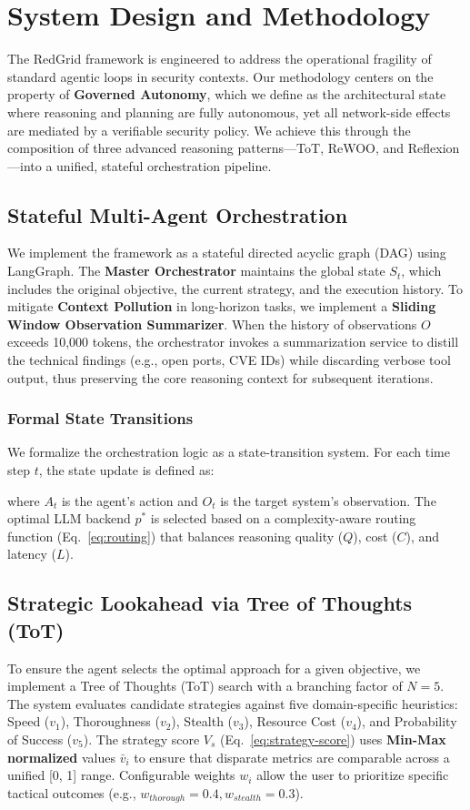 \section{System Design and Methodology}

The RedGrid framework is engineered to address the operational fragility of standard agentic loops in security contexts. Our methodology centers on the property of \textbf{Governed Autonomy}, which we define as the architectural state where reasoning and planning are fully autonomous, yet all network-side effects are mediated by a verifiable security policy. We achieve this through the composition of three advanced reasoning patterns—ToT, ReWOO, and Reflexion—into a unified, stateful orchestration pipeline.

\subsection{Stateful Multi-Agent Orchestration}
We implement the framework as a stateful directed acyclic graph (DAG) using LangGraph. The \textbf{Master Orchestrator} maintains the global state $S_t$, which includes the original objective, the current strategy, and the execution history. 
To mitigate \textbf{Context Pollution} in long-horizon tasks, we implement a \textbf{Sliding Window Observation Summarizer}. When the history of observations $O$ exceeds 10,000 tokens, the orchestrator invokes a summarization service to distill the technical findings (e.g., open ports, CVE IDs) while discarding verbose tool output, thus preserving the core reasoning context for subsequent iterations.

\subsubsection{Formal State Transitions}
We formalize the orchestration logic as a state-transition system. For each time step $t$, the state update is defined as:

where $A_t$ is the agent's action and $O_t$ is the target system's observation. The optimal LLM backend $p^*$ is selected based on a complexity-aware routing function (Eq.~\ref{eq:routing}) that balances reasoning quality ($Q$), cost ($C$), and latency ($L$).



\subsection{Strategic Lookahead via Tree of Thoughts (ToT)}
To ensure the agent selects the optimal approach for a given objective, we implement a Tree of Thoughts (ToT) search with a branching factor of $N=5$. 
The system evaluates candidate strategies against five domain-specific heuristics: Speed ($v_1$), Thoroughness ($v_2$), Stealth ($v_3$), Resource Cost ($v_4$), and Probability of Success ($v_5$). The strategy score $V_s$ (Eq.~\ref{eq:strategy-score}) uses \textbf{Min-Max normalized} values $\bar{v}_i$ to ensure that disparate metrics are comparable across a unified [0, 1] range. Configurable weights $w_i$ allow the user to prioritize specific tactical outcomes (e.g., $w_{thorough}=0.4, w_{stealth}=0.3$).

